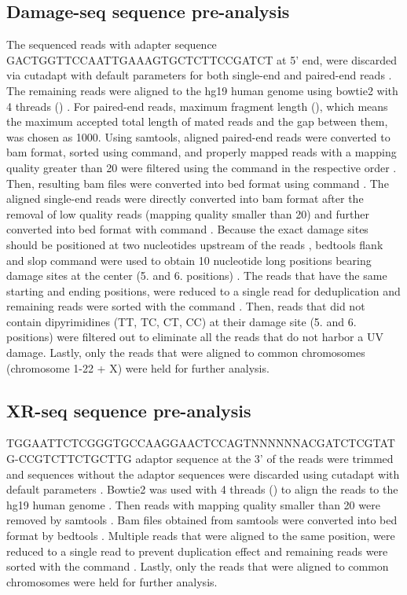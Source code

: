 \subsection{Damage-seq sequence pre-analysis}
The sequenced reads with adapter sequence GACTGGTTCCAATTGAAAGTGCTCTTCCGATCT at 5' end, were discarded via cutadapt with default parameters for both single-end and paired-end reads \citep{martin2011cutadapt}. The remaining reads were aligned to the hg19 human genome using bowtie2 with 4 threads () \citep{langmead2012fast}. For paired-end reads, maximum fragment length (), which means the maximum accepted total length of mated reads and the gap between them, was chosen as 1000. Using samtools, aligned paired-end reads were converted to bam format, sorted using  command, and properly mapped reads with a mapping quality greater than 20 were filtered using the command  in the respective order \citep{li2009sequence}. Then, resulting bam files were converted into bed format using  command \citep{quinlan2010bedtools}. The aligned single-end reads were directly converted into bam format after the removal of low quality reads (mapping quality smaller than 20) and further converted into bed format with  command \citep{quinlan2010bedtools}. Because the exact damage sites should be positioned at two nucleotides upstream of the reads \citep{li2009sequence}, bedtools flank and slop command were used to obtain 10 nucleotide long positions bearing damage sites at the center (5. and 6. positions) \citep{quinlan2010bedtools}. The reads that have the same starting and ending positions, were reduced to a single read for deduplication and remaining reads were sorted with the command . Then, reads that did not contain dipyrimidines (\gls{T}\gls{T}, \gls{T}\gls{C}, \gls{C}\gls{T}, \gls{C}\gls{C}) at their damage site (5. and 6. positions) were filtered out to eliminate all the reads that do not harbor a UV damage. Lastly, only the reads that were aligned to common chromosomes (chromosome 1-22 + X) were held for further analysis.

\subsection{XR-seq sequence pre-analysis}
TGGAATTCTCGGGTGCCAAGGAACTCCAGTNNNNNNACGATCTCGTATG-CCGTCTTCTGCTTG 
adaptor sequence at the 3' of the reads were trimmed and sequences without the adaptor sequences were discarded using cutadapt with default parameters \citep{martin2011cutadapt}. Bowtie2 was used with 4 threads () to align the reads to the hg19 human genome \citep{langmead2012fast}. Then reads with mapping quality smaller than 20 were removed by samtools \citep{li2009sequence}. Bam files obtained from samtools were converted into bed format by bedtools \citep{quinlan2010bedtools}. Multiple reads that were aligned to the same position, were reduced to a single read to prevent duplication effect and remaining reads were sorted with the command . Lastly, only the reads that were aligned to common chromosomes were held for further analysis.

